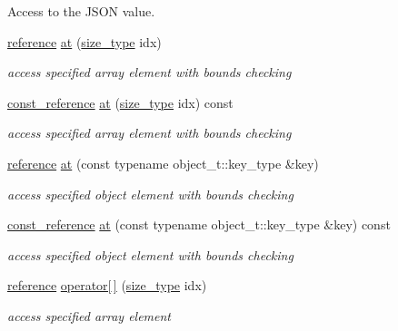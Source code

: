 Access to the J\+S\+ON value. \begin{DoxyCompactItemize}
\item 
\hyperlink{classnlohmann_1_1basic__json_a220ae98554a76205fb7f8822d36b2d5a}{reference} \hyperlink{classnlohmann_1_1basic__json_a52b18a5b7e68652c65b070900c438c6e}{at} (\hyperlink{classnlohmann_1_1basic__json_a3ada29bca70b4965f6fd37ec1c8f85f7}{size\+\_\+type} idx)
\begin{DoxyCompactList}\small\item\em access specified array element with bounds checking \end{DoxyCompactList}\item 
\hyperlink{classnlohmann_1_1basic__json_ab8a1c33ee7b154fc41ca2545aa9724e6}{const\+\_\+reference} \hyperlink{classnlohmann_1_1basic__json_aa4109d221c47331ec07d5adeee59e37e}{at} (\hyperlink{classnlohmann_1_1basic__json_a3ada29bca70b4965f6fd37ec1c8f85f7}{size\+\_\+type} idx) const 
\begin{DoxyCompactList}\small\item\em access specified array element with bounds checking \end{DoxyCompactList}\item 
\hyperlink{classnlohmann_1_1basic__json_a220ae98554a76205fb7f8822d36b2d5a}{reference} \hyperlink{classnlohmann_1_1basic__json_a239e942da82f2597d0cf5ec806f5bc0d}{at} (const typename object\+\_\+t\+::key\+\_\+type \&key)
\begin{DoxyCompactList}\small\item\em access specified object element with bounds checking \end{DoxyCompactList}\item 
\hyperlink{classnlohmann_1_1basic__json_ab8a1c33ee7b154fc41ca2545aa9724e6}{const\+\_\+reference} \hyperlink{classnlohmann_1_1basic__json_a28d0c574dae460bf7e90a58ff0e40bb4}{at} (const typename object\+\_\+t\+::key\+\_\+type \&key) const 
\begin{DoxyCompactList}\small\item\em access specified object element with bounds checking \end{DoxyCompactList}\item 
\hyperlink{classnlohmann_1_1basic__json_a220ae98554a76205fb7f8822d36b2d5a}{reference} \hyperlink{classnlohmann_1_1basic__json_a9ea67fc1ef0ccc42e1d5388fe0416ae5}{operator\mbox{[}$\,$\mbox{]}} (\hyperlink{classnlohmann_1_1basic__json_a3ada29bca70b4965f6fd37ec1c8f85f7}{size\+\_\+type} idx)
\begin{DoxyCompactList}\small\item\em access specified array element \end{DoxyCompactList}\item 

\end{DoxyCompactItemize}
